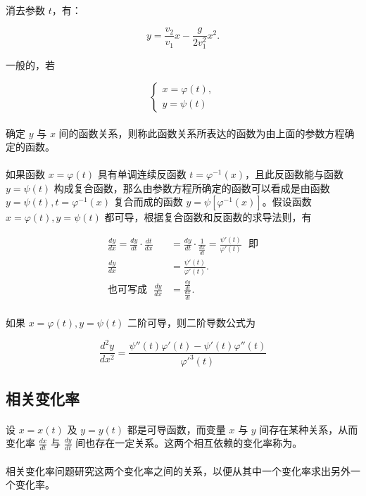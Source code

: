 \paragraph{}
消去参数 $t$，有：

\begin{equation}
y = \frac{v_2}{v_1}x - \frac{g}{2v_1^2}x^2.
\end{equation}

一般的，若

\begin{equation}
\left\{
\begin{array}{l}
  x = \varphi(t), \\
  y = \psi(t)
\end{array}
\right.
\end{equation}

\paragraph{}
确定 $y$ 与 $x$ 间的函数关系，则称此函数关系所表达的函数为由上面的参数方程确定的函数。

\paragraph{}
如果函数 $x = \varphi(t)$ 具有单调连续反函数 $t = \varphi^{-1}(x)$，且此反函数能与函数 $y = \psi(t)$ 构成复合函数，那么由参数方程所确定的函数可以看成是由函数 $y = \psi(t), t = \varphi^{-1}(x)$ 复合而成的函数 $y = \psi[\varphi^{-1}(x)]$。假设函数 $x = \varphi(t), y = \psi(t)$ 都可导，根据复合函数和反函数的求导法则，有

\begin{align}
\frac{dy}{dx} = \frac{dy}{dt} \cdot \frac{dt}{dx} &= \frac{dy}{dt} \cdot \frac{1}{\frac{dx}{dt}} = \frac{\psi'(t)}{\varphi'(t)} \text{~~即} \\
\frac{dy}{dx} &= \frac{\psi'(t)}{\varphi'(t)}. \\
\text{也可写成~~} \frac{dy}{dx} &= \frac{\frac{dy}{dt}}{\frac{dx}{dt}}.
\end{align}

\paragraph{}
如果 $x = \varphi(t), y = \psi(t)$ 二阶可导，则二阶导数公式为

\begin{equation}
\frac{d^2y}{dx^2} = \frac{\psi''(t)\varphi'(t) - \psi'(t)\varphi''(t)}{\varphi'^3(t)}
\end{equation}

\subsection{相关变化率}
\paragraph{}
设 $x = x(t)$ 及 $y = y(t)$ 都是可导函数，而变量 $x$ 与 $y$ 间存在某种关系，从而变化率 $\frac{dx}{dt}$ 与 $\frac{dy}{dt}$ 间也存在一定关系。这两个相互依赖的变化率称为。

\paragraph{}
相关变化率问题研究这两个变化率之间的关系，以便从其中一个变化率求出另外一个变化率。

